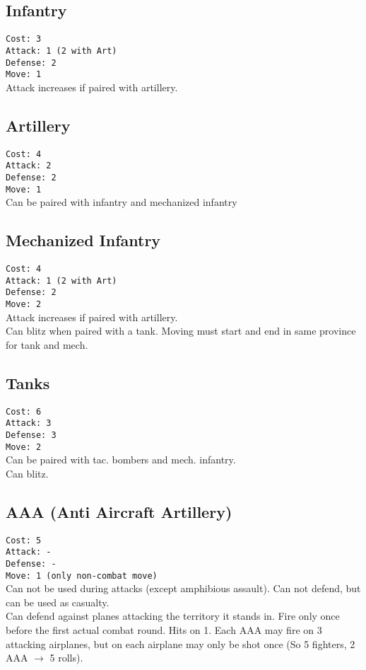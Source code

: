 \documentclass[10pt,a4paper,landscape]{article}
\begin{document}
\begin{multicols*}{3}
\subsection*{Infantry}
\texttt{Cost: 3 \\ Attack: 1 (2 with Art) \\ Defense: 2 \\ Move: 1}
\\
Attack increases if paired with artillery.

\subsection*{Artillery}
\texttt{Cost: 4 \\ Attack: 2 \\ Defense: 2 \\ Move: 1}
\\
Can be paired with infantry and mechanized infantry

\subsection*{Mechanized Infantry}
\texttt{Cost: 4 \\ Attack: 1 (2 with Art) \\ Defense: 2 \\ Move: 2}
\\
Attack increases if paired with artillery.\\
Can blitz when paired with a tank. Moving must start and end in same province for tank and mech.

\subsection*{Tanks}
\texttt{Cost: 6 \\ Attack: 3 \\ Defense: 3 \\ Move: 2}
\\
Can be paired with tac. bombers and mech. infantry.\\
Can blitz. 

\subsection*{AAA (Anti Aircraft Artillery)}
\texttt{Cost: 5 \\ Attack: - \\ Defense: - \\ Move: 1 (only non-combat move)}
\\
Can not be used during attacks (except amphibious assault). Can not defend, but can be used as casualty.\\
Can defend against planes attacking the territory it stands in. Fire only once before the first actual combat round. Hits on 1. Each AAA may fire on 3 attacking airplanes, but on each airplane may only be shot once (So 5 fighters, 2 AAA $\rightarrow$ 5 rolls).


\end{multicols*}
\end{document}
